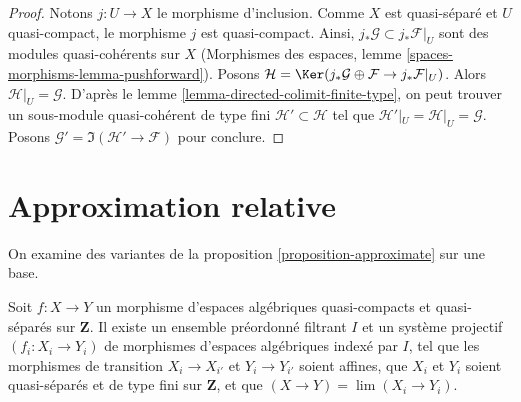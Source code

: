 \begin{proof}
Notons $j : U \to X$ le morphisme d'inclusion. Comme $X$ est quasi-séparé
et $U$ quasi-compact, le morphisme $j$ est quasi-compact. Ainsi,
$j_*\mathcal{G} \subset j_*\mathcal{F}|_U$ sont des modules quasi-cohérents
sur $X$ (Morphismes des espaces, lemme
\ref{spaces-morphisms-lemma-pushforward}).
Posons $\mathcal{H} =
\Ker(j_*\mathcal{G} \oplus \mathcal{F} \to j_*\mathcal{F}|_U)$.
Alors $\mathcal{H}|_U = \mathcal{G}$. D'après le
lemme \ref{lemma-directed-colimit-finite-type},
on peut trouver un sous-module quasi-cohérent de type fini
$\mathcal{H}' \subset \mathcal{H}$ tel que
$\mathcal{H}'|_U = \mathcal{H}|_U = \mathcal{G}$.
Posons $\mathcal{G}' = \Im(\mathcal{H}' \to \mathcal{F})$
pour conclure.
\end{proof}









\section{Approximation relative}
\label{section-relative-approximation}

\noindent
On examine des variantes de la proposition \ref{proposition-approximate}
sur une base.

\begin{lemma}
\label{lemma-approximate-morphism}
Soit $f : X \to Y$ un morphisme d'espaces algébriques quasi-compacts et quasi-séparés
sur $\mathbf{Z}$.
Il existe un ensemble préordonné filtrant $I$ et un système projectif $(f_i : X_i \to Y_i)$
de morphismes d'espaces algébriques indexé par $I$, tel que les morphismes de transition
$X_i \to X_{i'}$ et $Y_i \to Y_{i'}$ soient affines, que $X_i$
et $Y_i$ soient quasi-séparés et de type fini sur $\mathbf{Z}$, et
que $(X \to Y) = \lim (X_i \to Y_i)$.
\end{lemma}

